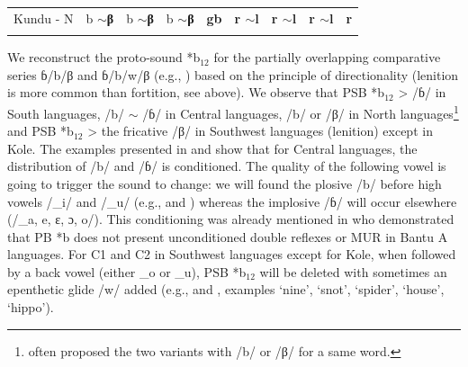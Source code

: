 \documentclass[output=paper,colorlinks,citecolor=brown
]{langscibook}
\begin{document}
\begin{table}
{\begin{tabular}{lllllllll}
Kundu - N    & b $\sim$\textbf{β}                                                            & b $\sim$\textbf{β}                   & b $\sim$\textbf{β}                                                            & \textbf{gb}                                                               & \textbf{r $\sim$l}    & \textbf{r $\sim$l}                                                        & \textbf{r $\sim$l}                     & \textbf{r}             \\ 
   \lspbottomrule
 \end{tabular}
 }
\end{table}

We reconstruct the proto-sound *b$_{12}$ for the partially overlapping comparative series ɓ/b/β and ɓ/b/w/β (e.g., ) based on the principle of directionality (lenition is more common than fortition, see above). We observe that PSB *b$_{12}$ > /ɓ/ in South languages, /b/ $\sim$ /ɓ/ in Central languages, /b/ or /β/ in North languages\footnote{\cite{friesen2002} often proposed the two variants with /b/ or /β/ for a same word.} and PSB *b$_{12}$ > the fricative /β/ in Southwest languages (lenition) except in Kole. The examples presented in  and  show that for Central languages, the distribution of /b/ and /ɓ/ is conditioned. The quality of the following vowel is going to trigger the sound to change: we will found the plosive /b/ before high vowels /\_i/ and /\_u/ (e.g.,  and ) whereas the implosive /ɓ/ will occur elsewhere (/\_a, e, ɛ, ɔ, o/). This conditioning was already mentioned in \citet[18]{philippson2022} who demonstrated that PB *b does not present unconditioned double reflexes or MUR in Bantu A languages. For C1 and C2 in Southwest languages except for Kole, when followed by a back vowel (either \_o or \_u), PSB *b$_{12}$ will be deleted with sometimes an epenthetic glide /w/ added (e.g.,  and , examples `nine', `snot', `spider', `house', `hippo'). 
\end{document}
